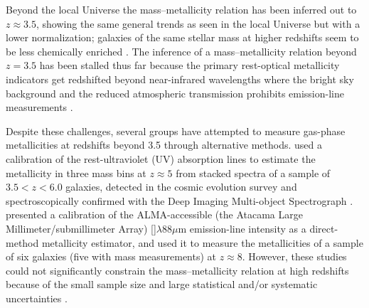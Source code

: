 \documentclass[twocolumn]{aastex631}
\begin{document}
Beyond the local Universe the mass--metallicity relation has been inferred out to $z \approx 3.5$, showing the same general trends as seen in the local Universe but with a lower normalization; galaxies of the same stellar mass at higher redshifts seem to be less chemically enriched \citep{2005ApJ...635..260S, 2006ApJ...644..813E, 2008A&A...488..463M, 2009MNRAS.398.1915M, 2011ApJ...730..137Z, 2014ApJ...791..130Z, 2014ApJ...792...75Z, 2012ApJ...755...73W, 2016ApJ...827...74W, 2013ApJ...772..141B, 2013ApJ...776L..27H, 2013ApJ...774..130K, 2014MNRAS.440.2300C, 2014MNRAS.437.3647Y, 2014ApJ...792....3M, 2014ApJ...795..165S, 2014A&A...563A..58T, 2016ApJ...826L..11K, 2015ApJ...802L..26K, 2015ApJ...805...45L, 2016ApJ...828...67L, 2015ApJ...799..138S, 2018ApJ...858...99S, 2020ApJ...888L..11S, sanders+2021, 2016MNRAS.463.2002H, 2016ApJ...822...42O, 2017ApJ...849...39S}.
The inference of a mass--metallicity relation beyond $z = 3.5$ has been stalled thus far because the primary rest-optical metallicity indicators get redshifted beyond near-infrared wavelengths where the bright sky background and the reduced atmospheric transmission prohibits emission-line measurements \citep[see][and references therein]{maiolino+2019, sanders+2021}. 

Despite these challenges, several groups have attempted to measure gas-phase metallicities at redshifts beyond 3.5 through alternative methods. 
\cite{2016ApJ...822...29F} used a calibration of the rest-ultraviolet (UV) absorption lines to estimate the metallicity in three mass bins at $z \approx 5$ from stacked spectra of a sample of $3.5 < z < 6.0$ galaxies, detected in the cosmic evolution survey \citep[COSMOS;][]{COSMOS} and spectroscopically confirmed with the Deep Imaging Multi-object Spectrograph \citep[DEIMOS;][]{2003SPIE.4841.1657F}. 
\cite{jones+2020} presented a calibration of the ALMA-accessible (the Atacama Large Millimeter/submillimeter Array) []$\lambda88\mu$m emission-line intensity as a direct-method metallicity estimator, and used it to measure the metallicities of a sample of six galaxies (five with mass measurements) at $z \approx 8$. 
However, these studies could not significantly constrain the mass--metallicity relation at high redshifts because of the small sample size and large statistical and/or systematic uncertainties \citep[see][for a discussion on systematic uncertainties]{maiolino+2019}.
\end{document}
